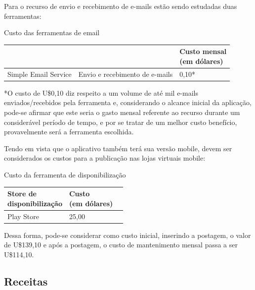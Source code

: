 Para o recurso de envio e recebimento de e-mails estão sendo estudadas duas ferramentas: 

\begin{quadro}[htb]
	\centering
	\ABNTEXfontereduzida
	\caption[Custo das ferramentas de email]{Custo das ferramentas de email}
	\label{quadro-exemplo}
	\begin{tabular}{|p{4.0cm}|p{4.0cm}|p{3.0cm}|}
		\hline
		\thead{Ferramenta} & \thead{Uso}  & \thead{Custo mensal\\(em dólares)} \\
		\hline
		Simple Email Service & Envio e recebimento de e-mails & 0,10*\\
		\hline
	\end{tabular}
\end{quadro}

*O custo de U\$0,10 diz respeito a um volume de até mil e-mails enviados/recebidos pela ferramenta e, considerando o alcance inicial da aplicação, pode-se afirmar que este seria o gasto mensal referente ao recurso durante um considerável período de tempo, e por se tratar de um melhor custo benefício, provavelmente será a ferramenta escolhida. 

Tendo em vista que o aplicativo também terá sua versão mobile, devem ser considerados os custos para a publicação nas lojas virtuais mobile: 

\begin{quadro}[htb]
	\centering
	\ABNTEXfontereduzida
	\caption[Custo da ferramenta de disponibilização]{Custo da ferramenta de disponibilização}
	\label{quadro-exemplo}
	\begin{tabular}{|p{4.0cm}|p{4.0cm}|p{3.0cm}|}
		\hline
		\thead{Store de\\ disponibilização} & \thead{Custo\\(em dólares)} \\
		\hline
		Play Store & 25,00 \\
		\hline
	\end{tabular}
\end{quadro}

Dessa forma, pode-se considerar como custo inicial, inserindo a postagem, o valor de U\$139,10 e após a postagem, o custo de mantenimento mensal passa a ser U\$114,10.

\subsection{Receitas}


